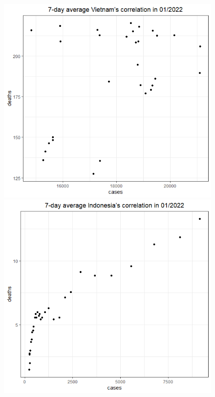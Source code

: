 \documentclass[a4paper]{article}
\theoremstyle{definition}
\begin{document}
\begin{enumerate}[1)]
\begin{figure}[H]
\begin{center}
        \includegraphics[scale = 0.3]{ix/ix.3/VN_01_2022.png}
        \includegraphics[scale = 0.3]{ix/ix.3/IDN_01_2022.png}

\end{center}
\end{figure}
\end{enumerate}
\end{document}
